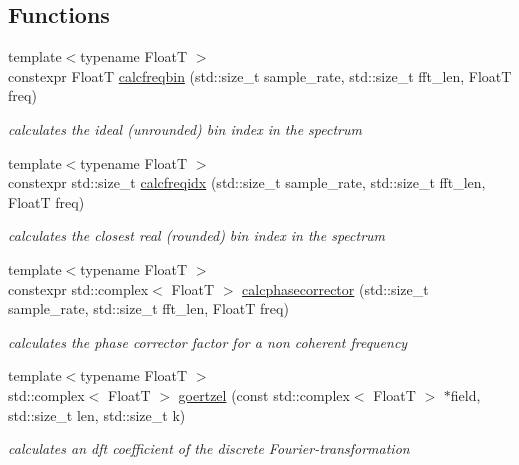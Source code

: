 \subsection*{Functions}
\begin{DoxyCompactItemize}
\item 
{\footnotesize template$<$typename FloatT $>$ }\\constexpr FloatT \hyperlink{namespacedevfix_1_1dsp_ad26b42af732561241b1d5260634c6a8f}{calcfreqbin} (std\+::size\+\_\+t sample\+\_\+rate, std\+::size\+\_\+t fft\+\_\+len, FloatT freq)
\begin{DoxyCompactList}\small\item\em calculates the ideal (unrounded) bin index in the spectrum \end{DoxyCompactList}\item 
{\footnotesize template$<$typename FloatT $>$ }\\constexpr std\+::size\+\_\+t \hyperlink{namespacedevfix_1_1dsp_a4c340dc6f142977c46850c3bd5467914}{calcfreqidx} (std\+::size\+\_\+t sample\+\_\+rate, std\+::size\+\_\+t fft\+\_\+len, FloatT freq)
\begin{DoxyCompactList}\small\item\em calculates the closest real (rounded) bin index in the spectrum \end{DoxyCompactList}\item 
{\footnotesize template$<$typename FloatT $>$ }\\constexpr std\+::complex$<$ FloatT $>$ \hyperlink{namespacedevfix_1_1dsp_a3f84878d478c956e3dd2e4d0939a31e4}{calcphasecorrector} (std\+::size\+\_\+t sample\+\_\+rate, std\+::size\+\_\+t fft\+\_\+len, FloatT freq)
\begin{DoxyCompactList}\small\item\em calculates the phase corrector factor for a non coherent frequency \end{DoxyCompactList}\item 
{\footnotesize template$<$typename FloatT $>$ }\\std\+::complex$<$ FloatT $>$ \hyperlink{namespacedevfix_1_1dsp_a5e776756816f3429899134f5c8b8b215}{goertzel} (const std\+::complex$<$ FloatT $>$ $\ast$field, std\+::size\+\_\+t len, std\+::size\+\_\+t k)
\begin{DoxyCompactList}\small\item\em calculates an dft coefficient of the discrete Fourier-\/transformation \end{DoxyCompactList}\item 

\end{DoxyCompactItemize}
